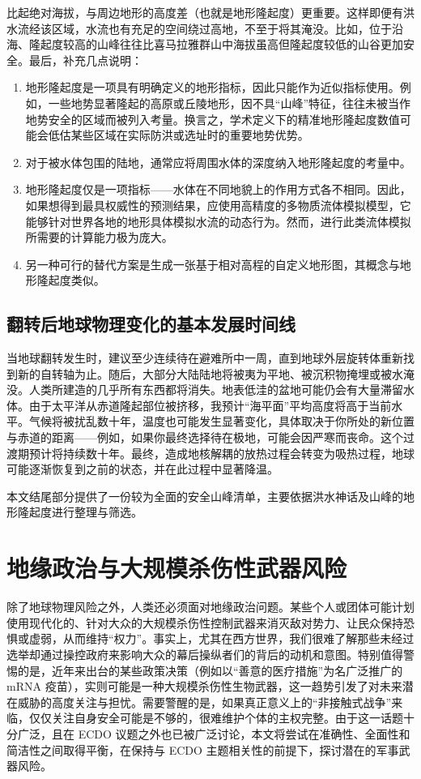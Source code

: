 \documentclass[10pt,twocolumn,letterpaper]{article}
\begin{document}
比起绝对海拔，与周边地形的高度差（也就是地形隆起度）更重要。这样即便有洪水流经该区域，水流也有充足的空间绕过高地，不至于将其淹没。比如，位于沿海、隆起度较高的山峰往往比喜马拉雅群山中海拔虽高但隆起度较低的山谷更加安全。最后，补充几点说明：
\begin{flushleft}
\begin{enumerate}
    \item 地形隆起度是一项具有明确定义的地形指标，因此只能作为近似指标使用。例如，一些地势显著隆起的高原或丘陵地形，因不具“山峰”特征，往往未被当作地势安全的区域而被列入考量。换言之，学术定义下的精准地形隆起度数值可能会低估某些区域在实际防洪或选址时的重要地势优势。
    \item 对于被水体包围的陆地，通常应将周围水体的深度纳入地形隆起度的考量中。
    \item 地形隆起度仅是一项指标——水体在不同地貌上的作用方式各不相同。因此，如果想得到最具权威性的预测结果，应使用高精度的多物质流体模拟模型，它能够针对世界各地的地形具体模拟水流的动态行为。然而，进行此类流体模拟所需要的计算能力极为庞大。
    \item 另一种可行的替代方案是生成一张基于相对高程的自定义地形图，其概念与地形隆起度类似。
\end{enumerate}
\end{flushleft}

\subsection{翻转后地球物理变化的基本发展时间线}
当地球翻转发生时，建议至少连续待在避难所中一周，直到地球外层旋转体重新找到新的自转轴为止。随后，大部分大陆陆地将被夷为平地、被沉积物掩埋或被水淹没。人类所建造的几乎所有东西都将消失。地表低洼的盆地可能仍会有大量滞留水体。由于太平洋从赤道隆起部位被挤移，我预计“海平面”平均高度将高于当前水平。气候将被扰乱数十年，温度也可能发生显著变化，具体取决于你所处的新位置与赤道的距离——例如，如果你最终选择待在极地，可能会因严寒而丧命。这个过渡期预计将持续数十年。最终，造成地核解耦的放热过程会转变为吸热过程，地球可能逐渐恢复到之前的状态，并在此过程中显著降温。

本文结尾部分提供了一份较为全面的安全山峰清单，主要依据洪水神话及山峰的地形隆起度进行整理与筛选。
\section{地缘政治与大规模杀伤性武器风险}

除了地球物理风险之外，人类还必须面对地缘政治问题。某些个人或团体可能计划使用现代化的、针对大众的大规模杀伤性控制武器来消灭敌对势力、让民众保持恐惧或虚弱，从而维持“权力”。事实上，尤其在西方世界，我们很难了解那些未经过选举却通过操控政府来影响大众的幕后操纵者们的背后的动机和意图。特别值得警惕的是，近年来出台的某些政策决策（例如以“善意的医疗措施”为名广泛推广的 mRNA 疫苗），实则可能是一种大规模杀伤性生物武器，这一趋势引发了对未来潜在威胁的高度关注与担忧。需要警醒的是，如果真正意义上的“非接触式战争”来临，仅仅关注自身安全可能是不够的，很难维护个体的主权完整。由于这一话题十分广泛，且在 ECDO 议题之外也已被广泛讨论，本文将尝试在准确性、全面性和简洁性之间取得平衡，在保持与 ECDO 主题相关性的前提下，探讨潜在的军事武器风险。
\end{document}
